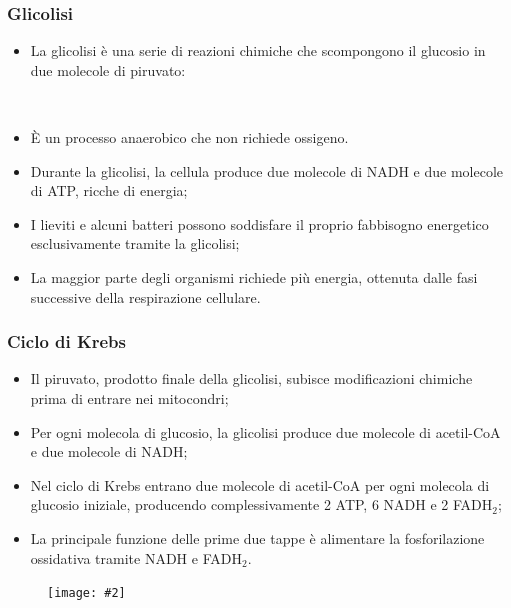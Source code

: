\documentclass{article}
\newcommand{\figbox}[1]{
    \begin{figure}[ht!]
        \begin{center}
            \fbox{#1}
        \end{center}
    \end{figure}
}
\newcommand{\cfig}[2]{
    \phantom{}
    \begin{figure}[ht!]
        \begin{center}
            \texttt{[image: \#2]}
        \end{center}
    \end{figure}
}
\newcommand{\chemscheme}[1]{
    \\
    \phantom{}
    \figbox{
        \schemestart
        #1
        \schemestop
    }
}
\begin{document}
\subsubsection{Glicolisi}
\begin{itemize}
    \item La glicolisi è una serie di reazioni chimiche che scompongono il glucosio in due
        molecole di piruvato:
        \chemscheme{C$_6$H$_{12}$O$_6$ + 6O$_2$ \arrow{->} 6CO$_2$ + 6H$_2$O + ATP}
    \item È un processo anaerobico che non richiede ossigeno.
    \item Durante la glicolisi, la cellula produce due molecole di NADH e due molecole di ATP,
        ricche di energia;
    \item I lieviti e alcuni batteri possono soddisfare il proprio fabbisogno energetico
        esclusivamente tramite la glicolisi;
    \item La maggior parte degli organismi richiede più energia, ottenuta dalle fasi
        successive della respirazione cellulare.
\end{itemize}

\subsubsection{Ciclo di Krebs}
\begin{itemize}
    \item Il piruvato, prodotto finale della glicolisi, subisce modificazioni chimiche prima
        di entrare nei mitocondri;
    \item Per ogni molecola di glucosio, la glicolisi produce due molecole di acetil-CoA e due
        molecole di NADH;
    \item Nel ciclo di Krebs entrano due molecole di acetil-CoA per ogni molecola di glucosio
        iniziale, producendo complessivamente 2 ATP, 6 NADH e 2 FADH$_2$;
    \item La principale funzione delle prime due tappe è alimentare la fosforilazione
        ossidativa tramite NADH e FADH$_2$.
\end{itemize}
\cfig{.6}{media/ciclo-di-krebs.png}
\end{document}
